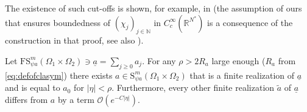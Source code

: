 \documentclass[
	fontsize=11pt, 
	twoside=false, 
	abstract=true, 
	a4paper,
]{scrartcl}
\newcommand{\sem}{\setminus\{0\}}
\newcommand{\RR}{\mathbb{R}}
\newcommand{\abs}[1]{\left\lvert#1\right\rvert}
\newcommand{\td}[1]{\tilde{#1}}
\newcommand{\ud}[1]{\underline{#1}}
\begin{document}
The existence of such cut-offs is shown, for example, in \cite[Prop.~3.2.1]{MR4436039} (the assumption of ours that ensures boundedness of $(\chi_j)_{j\in\mathbb{N}}$ in $C_c^\infty(\RR^{N^\ast})$ is a consequence of the construction in that proof, see also \cite[Lem.~2.2]{zbMATH03359011}).

\begin{lemma}\label{lem:finrea}
	Let $\mathrm{FS}^m_{\psi a}(\Omega_1\times\Omega_2) \ni \ud{a} =\sum_{j\geq 0}a_j$. For any $\rho> 2R_a$ large enough ($R_a$ from \cref{eq:defofclasym}) there exists $a \in \mathrm{S}^m_{\psi a}(\Omega_1\times\Omega_2)$ that is a finite realization of $\ud{a}$ and is equal to $a_0$ for $\abs{\eta} < \rho$. Furthermore, every other finite realization $\td{a}$ of $\ud{a}$ differs from $a$ by a term $\mathcal{O}(e^{-C\abs{\eta}})$.

\end{lemma}
\end{document}
